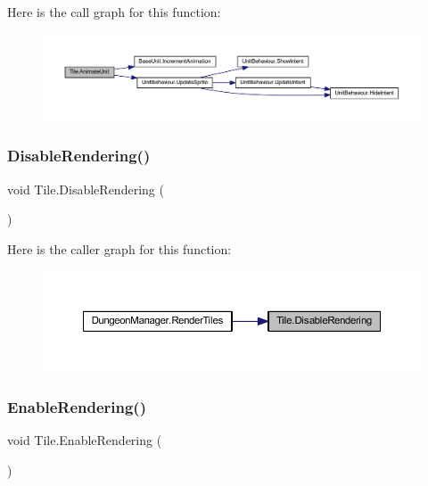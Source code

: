 Here is the call graph for this function\+:\nopagebreak
\begin{figure}[H]
\begin{center}
\leavevmode
\includegraphics[width=350pt]{class_tile_a87c523416006468a2791d61bf3be54ca_cgraph}
\end{center}
\end{figure}
\mbox{\label{class_tile_abf58797ff0c2df3eddfc9854c3f61dd2}} 
\subsubsection{\texorpdfstring{DisableRendering()}{DisableRendering()}}
{\footnotesize\ttfamily void Tile.\+Disable\+Rendering (\begin{DoxyParamCaption}{ }\end{DoxyParamCaption})}

Here is the caller graph for this function\+:\nopagebreak
\begin{figure}[H]
\begin{center}
\leavevmode
\includegraphics[width=350pt]{class_tile_abf58797ff0c2df3eddfc9854c3f61dd2_icgraph}
\end{center}
\end{figure}
\mbox{\label{class_tile_a1baa5fe3ab8f887e8985a85fba21210a}} 
\subsubsection{\texorpdfstring{EnableRendering()}{EnableRendering()}}
{\footnotesize\ttfamily void Tile.\+Enable\+Rendering (\begin{DoxyParamCaption}{ }\end{DoxyParamCaption})}

